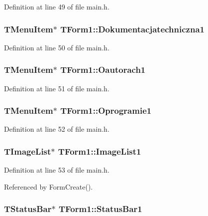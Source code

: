 Definition at line 49 of file main.h.\hypertarget{classTForm1_edc7039427508f681377845a13eb7c5b}{
\subsubsection[Dokumentacjatechniczna1]{\setlength{\rightskip}{0pt plus 5cm}TMenuItem$\ast$ {\bf TForm1::Dokumentacjatechniczna1}}}
\label{classTForm1_edc7039427508f681377845a13eb7c5b}




Definition at line 50 of file main.h.\hypertarget{classTForm1_bfdab287b3fce9e306b007b0530e90ac}{
\subsubsection[Oautorach1]{\setlength{\rightskip}{0pt plus 5cm}TMenuItem$\ast$ {\bf TForm1::Oautorach1}}}
\label{classTForm1_bfdab287b3fce9e306b007b0530e90ac}




Definition at line 51 of file main.h.\hypertarget{classTForm1_9ed5ecf8b1efefab3f773cfbd4c163d9}{
\subsubsection[Oprogramie1]{\setlength{\rightskip}{0pt plus 5cm}TMenuItem$\ast$ {\bf TForm1::Oprogramie1}}}
\label{classTForm1_9ed5ecf8b1efefab3f773cfbd4c163d9}




Definition at line 52 of file main.h.\hypertarget{classTForm1_6eb05a9c9d980ca92fa5a9dd976116df}{
\subsubsection[ImageList1]{\setlength{\rightskip}{0pt plus 5cm}TImageList$\ast$ {\bf TForm1::ImageList1}}}
\label{classTForm1_6eb05a9c9d980ca92fa5a9dd976116df}




Definition at line 53 of file main.h.

Referenced by FormCreate().\hypertarget{classTForm1_ad39517b2c266c91d742acba97cec969}{
\subsubsection[StatusBar1]{\setlength{\rightskip}{0pt plus 5cm}TStatusBar$\ast$ {\bf TForm1::StatusBar1}}}
\label{classTForm1_ad39517b2c266c91d742acba97cec969}




